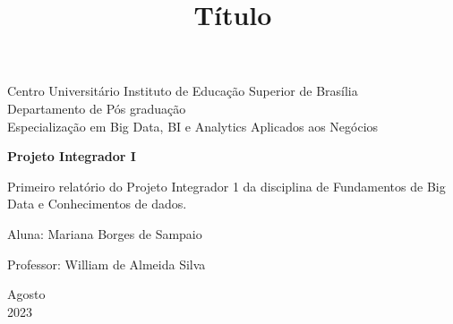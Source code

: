 \documentclass[a4paper, 12pt]{article}
\begin{document}
\begin{titlepage}
	\begin{center}
	

		\Huge{Centro Universitário Instituto de Educação Superior de Brasília}\\
		\large{Departamento de Pós graduação}\\ 
		\large{Especialização em Big Data, BI e Analytics Aplicados aos Negócios}\\ 
\vspace{12pt}
        
        \vspace{70pt}
        
		\textbf{\LARGE{Projeto Integrador I}}
		\title{\large{Título}}
			
	\end{center}
\vspace{1,5cm}
	
	\begin{flushright}

   \begin{list}{}{
      \setlength{\leftmargin}{4.5cm}
      \setlength{\rightmargin}{0cm}
      \setlength{\labelwidth}{0pt}
      \setlength{\labelsep}{\leftmargin}}

      \item Primeiro relatório do Projeto Integrador 1 da disciplina de Fundamentos de Big Data e Conhecimentos de dados.
      \begin{list}{}{
      \setlength{\leftmargin}{0cm}
      \setlength{\rightmargin}{0cm}
      \setlength{\labelwidth}{0pt}
      \setlength{\labelsep}{\leftmargin}}

			\item Aluna: Mariana Borges de Sampaio \
            \item Professor: William de Almeida Silva \

      \end{list}
   \end{list}
\end{flushright}
\vspace{1cm}
\begin{center}
		\vspace{\fill}
		 Agosto\\
		 2023
			\end{center}
\end{titlepage}
\newpage
\newpage
\tableofcontents
\thispagestyle{empty}
\end{document}
